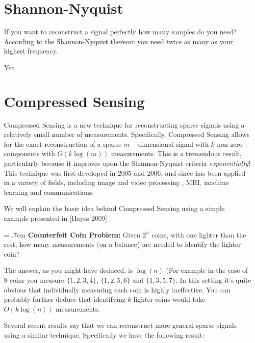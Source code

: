 \label{Ch:NNS}


\section*{Shannon-Nyquist}

If you want to reconstruct a signal perfectly how many samples do you need? According to the  Shannon-Nyquist thereom you need twice as many as your highest frequency.


\begin{problem}
Yea
\end{problem}


\section*{Compressed Sensing}


Compressed Sensing is a new technique for reconstructing sparse signals using a relatively small number of measurements. Specifically, Compressed Sensing allows for the exact reconstruction of a sparse $m-$dimensional signal with $k$ non-zero components with $O(k \log (m))$ measurements. This is a tremendous result, particularly because it improves upon the Shannon-Nyquist criteria \emph{exponentially}! This technique was first developed in 2005 and 2006, and since has been applied in a variety of fields, including image and video processing , MRI, machine learning and communications.

We will explain the basic idea behind Compressed Sensing using a simple example presented in [Hayes 2009]


\hangindent = .7cm
\setlength{\parindent}{.7cm}
\textbf{Counterfeit Coin Problem:} Given $2^n$ coins, with one lighter than the rest, how many measurements (on a balance) are needed to identify the lighter coin?
\setlength{\parindent}{0cm}

The answer, as you might have deduced, is $\log(n)$ (For example in the case of 8 coins you measure $\{1,2,3,4\}$, $\{1,2,5,6\}$ and $\{1,3,5,7\}$. In this setting it's quite obvious that individually measuring each coin is highly ineffective. You can probably further deduce that identifying $k$ lighter coins would take $O(k \log(n))$ measurements.

Several recent results say that we can reconstruct more general sparse signals using a similar technique. Specifically we have the following result:

